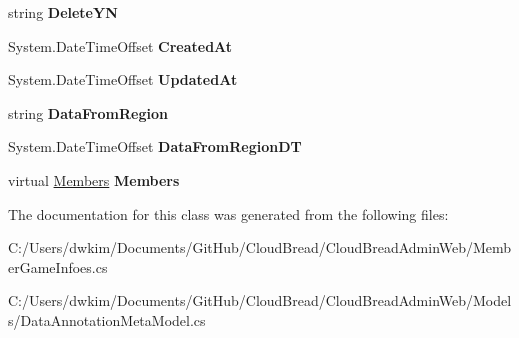 \begin{DoxyCompactItemize}
\item 
string {\bfseries Delete\+YN}\hypertarget{a00137_acda4a0684a0551dbadfd6247381dab0a}{}\label{a00137_acda4a0684a0551dbadfd6247381dab0a}

\item 
System.\+Date\+Time\+Offset {\bfseries Created\+At}\hypertarget{a00137_a1eedfd38a7f73f617fae4c99689efec2}{}\label{a00137_a1eedfd38a7f73f617fae4c99689efec2}

\item 
System.\+Date\+Time\+Offset {\bfseries Updated\+At}\hypertarget{a00137_a145aedc78a55ca2de533ba1853fe7d4c}{}\label{a00137_a145aedc78a55ca2de533ba1853fe7d4c}

\item 
string {\bfseries Data\+From\+Region}\hypertarget{a00137_a96ab395fc35abaf272db437bf2dc0e2d}{}\label{a00137_a96ab395fc35abaf272db437bf2dc0e2d}

\item 
System.\+Date\+Time\+Offset {\bfseries Data\+From\+Region\+DT}\hypertarget{a00137_add0f2fd40b1bbb50f70a3589899a46e3}{}\label{a00137_add0f2fd40b1bbb50f70a3589899a46e3}

\item 
virtual \hyperlink{a00145}{Members} {\bfseries Members}\hypertarget{a00137_af2d86fb53e7aaa690e9fe4188cd44fe9}{}\label{a00137_af2d86fb53e7aaa690e9fe4188cd44fe9}

\end{DoxyCompactItemize}


The documentation for this class was generated from the following files\+:\begin{DoxyCompactItemize}
\item 
C\+:/\+Users/dwkim/\+Documents/\+Git\+Hub/\+Cloud\+Bread/\+Cloud\+Bread\+Admin\+Web/Member\+Game\+Infoes.\+cs\item 
C\+:/\+Users/dwkim/\+Documents/\+Git\+Hub/\+Cloud\+Bread/\+Cloud\+Bread\+Admin\+Web/\+Models/Data\+Annotation\+Meta\+Model.\+cs\end{DoxyCompactItemize}
